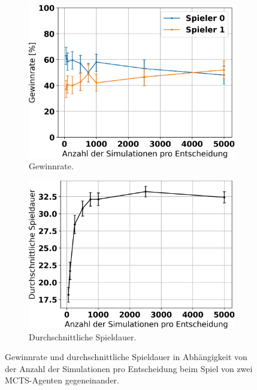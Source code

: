 \begin{figure}[ht!]%
	\begin{subfigure}[b]{0.48\textwidth}
		\includegraphics[width=\textwidth]{Bilder/mcts_vs_mcts_win_rate_vs_n_simulations.png}
		\caption{Gewinnrate.}
		\label{fig:f7}
	\end{subfigure}
	\hfill
	\begin{subfigure}[b]{0.48\textwidth}
		\includegraphics[width=\textwidth]{Bilder/mcts_vs_mcts_game_length_vs_n_simulations.png}
		\caption{Durchschnittliche Spieldauer.}
		\label{fig:f8}
	\end{subfigure}
	\caption{Gewinnrate und durchschnittliche Spieldauer in Abhängigkeit von der Anzahl der Simulationen pro Entscheidung beim Spiel von zwei MCTS-Agenten gegeneinander.}
\end{figure}

